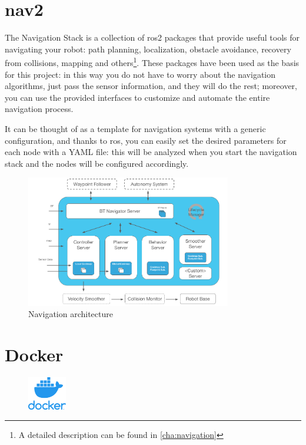 \section{\acrfull{nav2}}

The Navigation Stack is a collection of \acrshort{ros}2 packages that provide useful tools for navigating your robot: path planning, localization, obstacle avoidance, recovery from collisions, mapping and others\footnote{A detailed description can be found in \autoref{cha:navigation}}. These packages have been used as the basis for this project: in this way you do not have to worry about the navigation algorithms, just pass the sensor information, and they will do the rest; moreover, you can use the provided interfaces to customize and automate the entire navigation process.

It can be thought of as a template for navigation systems with a generic configuration, and thanks to \Acrshort{ros}, you can easily set the desired parameters for each node with a YAML file: this will be analyzed when you start the navigation stack and the nodes will be configured accordingly.

\begin{figure}[h]
    \centering
    \includegraphics[width=0.8\textwidth]{images/nav2_architecture}
    \caption{Navigation architecture}
\end{figure}

\section{Docker}
  
\begin{figure}
    \includegraphics[width=0.15\textwidth]{images/docker}
\end{figure}
  
